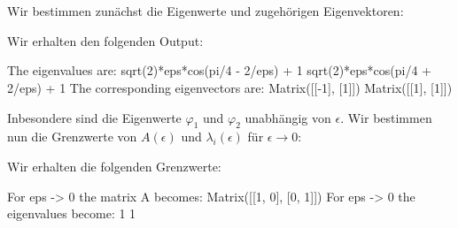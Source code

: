 \section{}

Wir bestimmen zunächst die Eigenwerte und zugehörigen Eigenvektoren:



Wir erhalten den folgenden Output:

\begin{consoleoutput}
The eigenvalues are:
sqrt(2)*eps*cos(pi/4 - 2/eps) + 1
sqrt(2)*eps*cos(pi/4 + 2/eps) + 1
The corresponding eigenvectors are:
Matrix([[-1], [1]])
Matrix([[1], [1]])
\end{consoleoutput}

Inbesondere sind die Eigenwerte $\varphi_1$ und $\varphi_2$ unabhängig von $\epsilon$.
Wir bestimmen nun die Grenzwerte von $A(\epsilon)$ und $\lambda_i(\epsilon)$ für $\epsilon \to 0$:



Wir erhalten die folgenden Grenzwerte:

\begin{consoleoutput}
For eps -> 0 the matrix A becomes:
Matrix([[1, 0], [0, 1]])
For eps -> 0 the eigenvalues become:
1
1
\end{consoleoutput}
